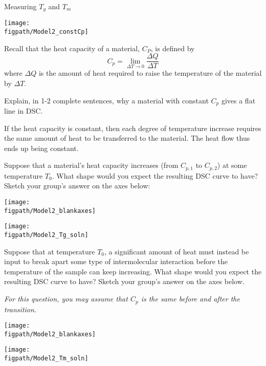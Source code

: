 \begin{activity}{Measuring $T_g$ and $T_m$}
\begin{model}
		\centerline{\texttt{[image: \\figpath/Model2\_constCp]}}
	
\end{model}

\begin{ctqs}

	\question Recall that the heat capacity of a material, $C_P$, is defined by
		\begin{equation*}
			C_p = \lim_{\Delta T\to 0} \frac{\Delta Q}{\Delta T}
		\end{equation*}
		where $\Delta Q$ is the amount of heat required to raise the temperature of the material by $\Delta T$.
		
		Explain, in 1-2 complete sentences, why a material with constant $C_p$ gives a flat line in DSC.
		
			\begin{solution}[1in]{}
				If the heat capacity is constant, then each degree of temperature increase requires the same amount of heat to be transferred to the material.  The heat flow thus ends up being constant.
			\end{solution}
		
	\question Suppose that a material's heat capacity increases (from $C_{p,1}$ to $C_{p,2}$) at some temperature $T_0$.  What shape would you expect the resulting DSC curve to have?  Sketch your group's answer on the axes below: \label{\labelbase:ctq:CPincrease}
	
		\vspace{6pt}
		\begin{solution}[1.9in]{
			\centerline{\texttt{[image: \\figpath/Model2\_blankaxes]}}
		}
			\centerline{\texttt{[image: \\figpath/Model2\_Tg\_soln]}}
		\end{solution}
		
	\question Suppose that at temperature $T_0$, a significant amount of heat must instead be input to break apart some type of intermolecular interaction before the temperature of the sample can keep increasing.  What shape would you expect the resulting DSC curve to have?  Sketch your group's answer on the axes below.\label{\labelbase:ctq:delHtrans}
	
		\emph{For this question, you may assume that $C_p$ is the same before and after the transition.}
	
		\vspace{6pt}
		\begin{solution}[1.9in]{
			\centerline{\texttt{[image: \\figpath/Model2\_blankaxes]}}
		}
			\centerline{\texttt{[image: \\figpath/Model2\_Tm\_soln]}}
		\end{solution}
		

\end{ctqs}
\end{activity}

